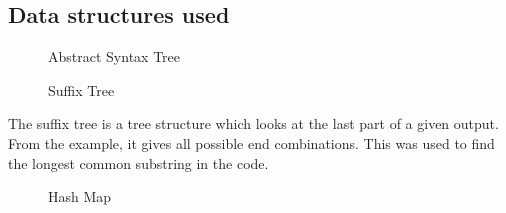 \documentclass[11pt,a4paper]{article}
\begin{document}
\subsection{Data structures used}

\begin{figure}[H]
  \caption{Abstract Syntax Tree\cite{schleimer}}
  \label{fig:abstractsyntaxtree}
\end{figure}

\begin{figure}[H]
  \caption{Suffix Tree\cite{unknown2}}
  \label{fig:suffixtree}
\end{figure}

The suffix tree is a tree structure which looks at the last part of a
given output. From the example, it gives all possible end combinations. This was
used to find the longest common substring in the code.

\begin{figure}[H]
  \caption{Hash Map\cite{unknown1}}
  \label{fig:hashmap}
\end{figure}
\end{document}
